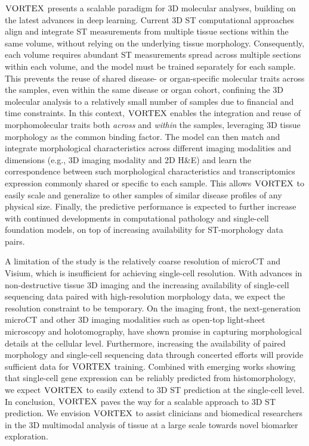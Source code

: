 $\textsc{VORTEX}$ presents a scalable paradigm for 3D molecular analyses, building on the latest advances in deep learning. Current 3D ST computational approaches align and integrate ST measurements from multiple tissue sections within the same volume, without relying on the underlying tissue morphology\cite{zeira2022alignment, zhou2023integrating, wang2023construction,mo2024tumour, schott2024open, tang2024search}.
Consequently, each volume requires abundant ST measurements spread across multiple sections within each volume, and the model must be trained separately for each sample.
This prevents the reuse of shared disease- or organ-specific molecular traits across the samples, even within the same disease or organ cohort, confining the 3D molecular analysis to a relatively small number of samples due to financial and time constraints. 
In this context, $\textsc{VORTEX}$ enables the integration and reuse of morphomolecular traits both \textit{across} and \textit{within} the samples, leveraging 3D tissue morphology as the common binding factor. The model can then match and integrate morphological characteristics across different imaging modalities and dimensions (e.g., 3D imaging modality and 2D H\&E) and learn the correspondence between such morphological characteristics and transcriptomics expression commonly shared or specific to each sample. This allows $\textsc{VORTEX}$ to easily scale and generalize to other samples of similar disease profiles of any physical size.
Finally, the predictive performance is expected to further increase with continued developments in computational pathology\cite{jaume2024hest, chen2024towards, zimmermann2024virchow, campanella2024clinical} and single-cell foundation models\cite{cui2024scgpt, hao2024large}, on top of increasing availability for ST-morphology data pairs.

A limitation of the study is the relatively coarse resolution of microCT and Visium, which is insufficient for achieving single-cell resolution. With advances in non-destructive tissue 3D imaging and the increasing availability of single-cell sequencing data paired with high-resolution morphology data, we expect the resolution constraint to be temporary. On the imaging front, the next-generation microCT\cite{frohn20203d, walsh2021imaging,palermo2025investigating} and other 3D imaging modalities such as open-top light-sheet microscopy\cite{glaser2017light, bishop2024end} and holotomography\cite{kim2024holotomography}, have shown promise in capturing morphological details at the cellular level. Furthermore, increasing the availability of paired morphology and single-cell sequencing data through concerted efforts\cite{jaume2024hest, chen2024stimagekm} will provide sufficient data for $\textsc{VORTEX}$ training. Combined with emerging works showing that single-cell gene expression can be reliably predicted from histomorphology\cite{comiter2023inference, chadoutaud2024scellst, zhang2024inferring}, we expect $\textsc{VORTEX}$ to easily extend to 3D ST prediction at the single-cell level.
In conclusion, $\textsc{VORTEX}$ paves the way for a scalable approach to 3D ST prediction. 
We envision $\textsc{VORTEX}$ to assist clinicians and biomedical researchers in the 3D multimodal analysis of tissue at a large scale towards novel biomarker exploration.